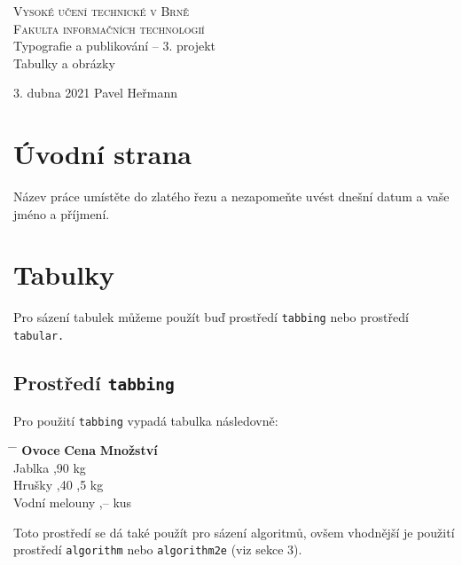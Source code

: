 \documentclass[a4paper, 11pt]{article}
\begin{document}
\begin{titlepage}

    \begin{center}
        \Huge
        \textsc{Vysoké učení technické v Brně\\\huge{Fakulta informačních technologií} }\\
        \LARGE{Typografie a publikování -- 3. projekt\\}
        \Huge{Tabulky a obrázky}
    \end{center}
    \LARGE{3. dubna 2021} 
    \hfill
    \LARGE{Pavel Heřmann}
\end{titlepage}

\section{Úvodní strana}
Název práce umístěte do zlatého řezu a nezapomeňte uvést dnešní datum a vaše jméno a příjmení.



\section{Tabulky}
Pro sázení tabulek můžeme použít buď prostředí \verb=tabbing= nebo prostředí \verb=tabular.=



\subsection{Prostředí \texttt{tabbing}}
Pro použití \texttt{tabbing} vypadá tabulka následovně:
\par

\begin{tabbing}
\hspace{8em}    \= \hspace{3.5em}     \= \hspace{1em} \kill
\textbf{Ovoce}  \>\textbf{Cena}     \>\textbf{Množství} \\
Jablka          ,90              kg \\
Hrušky          ,40             ,5 kg \\
Vodní melouny   ,–               kus \\
\end{tabbing}
Toto prostředí se dá také použít pro sázení algoritmů, ovšem vhodnější je použití prostředí \verb=algorithm= nebo \verb=algorithm2e= (viz sekce 3).
\end{document}
